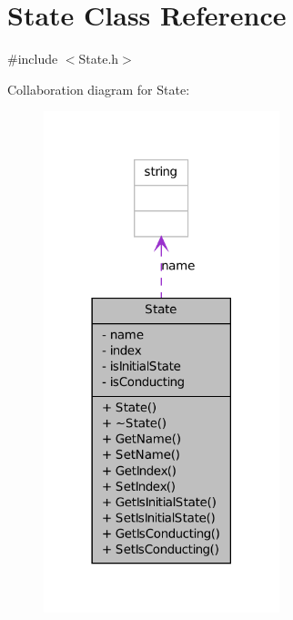 \hypertarget{classState}{
\section{State Class Reference}
\label{classState}
}


{\ttfamily \#include $<$State.h$>$}



Collaboration diagram for State:\nopagebreak
\begin{figure}[H]
\begin{center}
\leavevmode
\includegraphics[width=194pt]{classState__coll__graph}
\end{center}
\end{figure}
